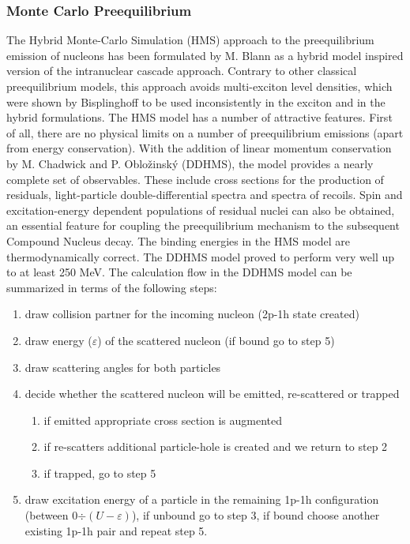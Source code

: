 \documentclass[twocolumn,amsmath,amssymb,10pt,groupedaddress,a4paper]{revtex4}
\begin{document}
\subsubsection{Monte Carlo Preequilibrium\label{DDHMS}}
The Hybrid Monte-Carlo Simulation (HMS) approach to the preequilibrium
emission of nucleons  has
been formulated by M. Blann \cite{Blann-HMS} as a hybrid model
\cite{hybrid,hybrid1,hybrid2,hybrid3}
inspired version of the intranuclear cascade approach. Contrary to
other classical preequilibrium models, this approach avoids multi-exciton
level densities, which were shown by Bisplinghoff
\cite{Bisplinghoff} to be used inconsistently in the exciton and
in the hybrid formulations. The HMS model has a number
of attractive features. First of all, there are no physical limits
on a number of preequilibrium emissions (apart from energy conservation).
With the addition of linear momentum conservation by M. Chadwick and
P. Oblo\v zinsk\' y (DDHMS), the model provides a nearly complete
set of observables. These include cross sections for the production
of residuals, light-particle double-differential spectra and spectra
of recoils. Spin and excitation-energy dependent populations of residual
nuclei can also be obtained, an essential feature for coupling the
preequilibrium mechanism to the subsequent Compound Nucleus decay.
The binding energies in the HMS model are thermodynamically
correct. The DDHMS model proved to perform very well
up to at least 250 MeV.
The calculation flow in the DDHMS model can be summarized in terms
of the following steps:
\begin{enumerate}
\item draw collision partner for the incoming nucleon (2p-1h state created)
\item draw energy ($\varepsilon$) of the scattered nucleon (if bound go
to step 5)
\item draw scattering angles for both particles
\item decide whether the scattered nucleon will be emitted, re-scattered
or trapped
\begin{enumerate}
\item if emitted appropriate cross section is augmented
\item if re-scatters additional particle-hole is created and we return to
step 2
\item if trapped, go to step 5
\end{enumerate}
\item draw excitation energy of a particle in the remaining 1p-1h configuration
(between 0$\div(U-\varepsilon)$), if unbound go to step 3, if bound
choose another existing 1p-1h pair and repeat step 5.
\end{enumerate}
\end{document}
